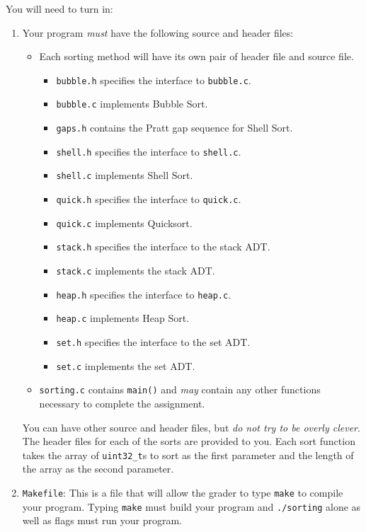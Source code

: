 \documentclass[11pt]{article}
\begin{document}
You will need to turn in:

\begin{enumerate}
  \item Your program \emph{must} have the following source and header files:
  \begin{itemize}
    \item Each sorting method will have its own pair of header file and source file.
    \begin{itemize}
      \item \texttt{bubble.h} specifies the interface to \texttt{bubble.c}.
      \item \texttt{bubble.c} implements Bubble Sort.
      \item \texttt{gaps.h} contains the Pratt gap sequence for Shell
        Sort.
      \item \texttt{shell.h} specifies the interface to \texttt{shell.c}.
      \item \texttt{shell.c} implements Shell Sort.
      \item \texttt{quick.h} specifies the interface to \texttt{quick.c}.
      \item \texttt{quick.c} implements Quicksort.
      \item \texttt{stack.h} specifies the interface to the stack ADT.
      \item \texttt{stack.c} implements the stack ADT.
      \item \texttt{heap.h} specifies the interface to \texttt{heap.c}.
      \item \texttt{heap.c} implements Heap Sort.
      \item \texttt{set.h} specifies the interface to the set ADT.
      \item \texttt{set.c} implements the set ADT.
    \end{itemize}
    \item \texttt{sorting.c} contains \texttt{main()} and \emph{may}
      contain any other functions necessary to complete the assignment.
  \end{itemize}

You can have other source and header files, but \emph{do not try to be
overly clever}. The header files for each of the sorts are provided to
you. Each sort function takes the array of \texttt{uint32\_t}s to sort
as the first parameter and the length of the array as the second
parameter.

  \item \texttt{Makefile}: This is a file that will allow the grader to
    type \texttt{make} to compile your program. Typing \texttt{make}
    must build your program and \texttt{./sorting} alone as well as
    flags must run your program.


\end{enumerate}
\end{document}
